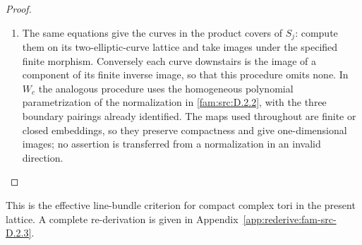\begin{proof}
\begin{enumerate}[label=\arabic*.,leftmargin=*]
\item The same equations give the curves in the product covers of $S_j$:
compute them on its two-elliptic-curve lattice and take images under the
specified finite morphism. Conversely each curve downstairs is the image
of a component of its finite inverse image, so that this procedure omits
none. In $W_c$ the analogous procedure uses the homogeneous polynomial
parametrization of the normalization in \ref{fam:src:D.2.2}, with the three boundary
pairings already identified. The maps used throughout are finite or
closed embeddings, so they preserve compactness and give one-dimensional
images; no assertion is transferred from a normalization in an invalid
direction.
\end{enumerate}
\end{proof}



This is the effective line-bundle criterion for compact complex tori in the present lattice. A complete re-derivation is given in Appendix~\ref{app:rederive:fam-src-D.2.3}.




